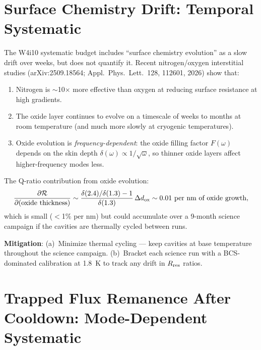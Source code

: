 \documentclass[11pt]{article}
\theoremstyle{definition}
\theoremstyle{remark}
\begin{document}
\section{Surface Chemistry Drift: Temporal Systematic}
\label{sec:chemistry}

The W4i10 systematic budget includes ``surface chemistry evolution''
as a slow drift over weeks, but does not quantify it. Recent nitrogen/oxygen
interstitial studies (arXiv:2509.18564; Appl.\ Phys.\ Lett.\ 128,
112601, 2026) show that:

\begin{enumerate}[nosep]
\item Nitrogen is $\sim$10$\times$ more effective than oxygen at reducing
  surface resistance at high gradients.
\item The oxide layer continues to evolve on a timescale of weeks to months
  at room temperature (and much more slowly at cryogenic temperatures).
\item Oxide evolution is \emph{frequency-dependent}: the oxide filling
  factor $F(\omega)$ depends on the skin depth $\delta(\omega) \propto
  1/\sqrt{\omega}$, so thinner oxide layers affect higher-frequency
  modes less.
\end{enumerate}

The Q-ratio contribution from oxide evolution:
\begin{equation}
\frac{\partial\mathcal{R}}{\partial(\text{oxide thickness})}
\sim \frac{\delta(2.4)/\delta(1.3) - 1}{\delta(1.3)}\,\Delta d_{\rm ox}
\sim 0.01~\text{per nm of oxide growth},
\end{equation}
which is small ($<$1\% per nm) but could accumulate over a 9-month
science campaign if the cavities are thermally cycled between runs.

\textbf{Mitigation}: (a)~Minimize thermal cycling --- keep cavities at
base temperature throughout the science campaign.
(b)~Bracket each science run with a BCS-dominated calibration at 1.8~K
to track any drift in $R_{\rm res}$ ratios.


\section{Trapped Flux Remanence After Cooldown: Mode-Dependent Systematic}
\label{sec:flux_hom}
\end{document}
